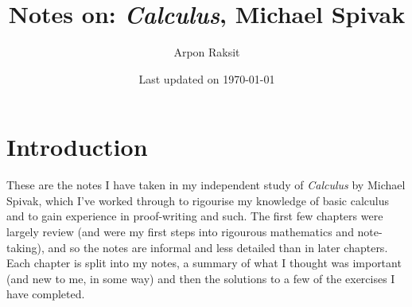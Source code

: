 \title{Notes on: \textit{Calculus}, Michael Spivak}
\author{Arpon Raksit}
\date{Last updated on \today}
\renewcommand{\headrulewidth}{0pt}
\maketitle

\tableofcontents

\newpage 
\section*{Introduction}

These are the notes I have taken in my independent study of \textit{Calculus} by Michael Spivak, which I've worked through to rigourise my knowledge of basic calculus and to gain experience in proof-writing and such. The first few chapters were largely review (and were my first steps into rigourous mathematics and note-taking), and so the notes are informal and less detailed than in later chapters. Each chapter is split into my notes, a summary of what I thought was important (and new to me, in some way) and then the solutions to a few of the exercises I have completed. 

\newpage

